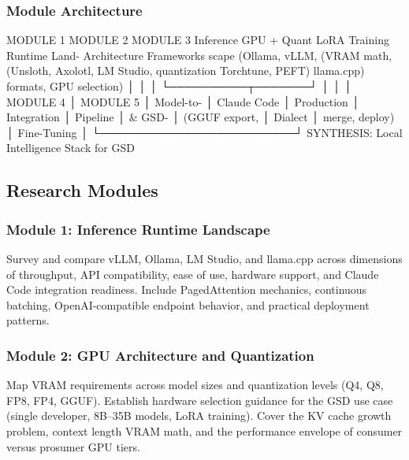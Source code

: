 \documentclass[11pt,letterpaper]{article}
\begin{document}
\subsubsection{Module Architecture}

\begin{asciibox}
  MODULE 1           MODULE 2           MODULE 3
  Inference          GPU + Quant        LoRA Training
  Runtime Land-      Architecture       Frameworks
  scape                                 
  (Ollama, vLLM,     (VRAM math,        (Unsloth, Axolotl,
  LM Studio,         quantization       Torchtune, PEFT)
  llama.cpp)         formats, GPU
                     selection)
       │                  │                  │
       └──────────┬───────┘                  │
                  │                          │
  MODULE 4        │              MODULE 5    │
  Model-to-       │              Claude Code │
  Production      │              Integration │
  Pipeline        │              & GSD-      │
  (GGUF export,   │              Dialect     │
  merge, deploy)  │              Fine-Tuning │
                  └─────────────────────────┘
                         SYNTHESIS:
                     Local Intelligence
                       Stack for GSD
\end{asciibox}

\subsection{Research Modules}

\subsubsection{Module 1: Inference Runtime Landscape}
Survey and compare vLLM, Ollama, LM Studio, and llama.cpp across dimensions of throughput, API compatibility, ease of use, hardware support, and Claude Code integration readiness. Include PagedAttention mechanics, continuous batching, OpenAI-compatible endpoint behavior, and practical deployment patterns.

\subsubsection{Module 2: GPU Architecture and Quantization}
Map VRAM requirements across model sizes and quantization levels (Q4, Q8, FP8, FP4, GGUF). Establish hardware selection guidance for the GSD use case (single developer, 8B--35B models, LoRA training). Cover the KV cache growth problem, context length VRAM math, and the performance envelope of consumer versus prosumer GPU tiers.
\end{document}
